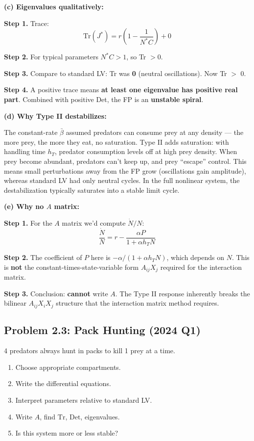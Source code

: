 \documentclass[10pt]{article}
\begin{document}
\begin{solution}
\medskip\textbf{(c) Eigenvalues qualitatively:}

\textbf{Step 1.} Trace:
\[
\text{Tr}(J^*) = r\left(1 - \frac{1}{N^* C}\right) + 0
\]

\textbf{Step 2.} For typical parameters $N^* C > 1$, so Tr $> 0$.

\textbf{Step 3.} Compare to standard LV: Tr was \textbf{0} (neutral oscillations). Now Tr $>$ 0.

\textbf{Step 4.} A positive trace means \textbf{at least one eigenvalue has positive real part}. Combined with positive Det, the FP is an \textbf{unstable spiral}.

\medskip\textbf{(d) Why Type II destabilizes:}

The constant-rate $\bar\beta$ assumed predators can consume prey at any density — the more prey, the more they eat, no saturation. Type II adds saturation: with handling time $h_T$, predator consumption levels off at high prey density. When prey become abundant, predators can't keep up, and prey ``escape'' control. This means small perturbations away from the FP grow (oscillations gain amplitude), whereas standard LV had only neutral cycles. In the full nonlinear system, the destabilization typically saturates into a stable limit cycle.

\medskip\textbf{(e) Why no $A$ matrix:}

\textbf{Step 1.} For the $A$ matrix we'd compute $\dot N/N$:
\[
\frac{\dot N}{N} = r - \frac{\alpha P}{1+\alpha h_T N}
\]

\textbf{Step 2.} The coefficient of $P$ here is $-\alpha/(1+\alpha h_T N)$, which depends on $N$. This is \textbf{not} the constant-times-state-variable form $A_{ij}X_j$ required for the interaction matrix.

\textbf{Step 3.} Conclusion: \textbf{cannot} write $A$. The Type II response inherently breaks the bilinear $A_{ij}X_iX_j$ structure that the interaction matrix method requires.
\end{solution}

\subsection{Problem 2.3: Pack Hunting (2024 Q1)}

\begin{problem}
4 predators always hunt in packs to kill 1 prey at a time.
\begin{enumerate}[label=(\alph*)]
\item Choose appropriate compartments.
\item Write the differential equations.
\item Interpret parameters relative to standard LV.
\item Write $A$, find $\text{Tr}$, $\text{Det}$, eigenvalues.
\item Is this system more or less stable?
\end{enumerate}
\end{problem}
\end{document}
